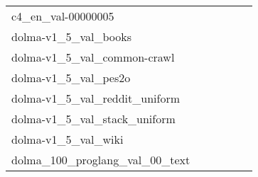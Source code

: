 {\begin{longtable}{m{6cm}m{1.7cm}m{1.7cm}m{1.7cm}m{1.7cm}m{1.7cm}}
	c4\_en\_val-00000005  & \colorbox[HTML]{fefee2}{\makebox[\mywidth][c]{12.77}} & \colorbox[HTML]{e4f4ab}{\makebox[\mywidth][c]{12.35}} & \colorbox[HTML]{ffffe5}{\makebox[\mywidth][c]{13.26}} & \colorbox[HTML]{daf0a4}{\makebox[\mywidth][c]{12.32}} & \colorbox[HTML]{77c578}{\makebox[\mywidth][c]{12.18}}\\
	dolma-v1\_5\_val\_books  & \colorbox[HTML]{fefee2}{\makebox[\mywidth][c]{13.00}} & \colorbox[HTML]{d5eea1}{\makebox[\mywidth][c]{12.44}} & \colorbox[HTML]{ffffe5}{\makebox[\mywidth][c]{13.64}} & \colorbox[HTML]{d4eea0}{\makebox[\mywidth][c]{12.44}} & \colorbox[HTML]{77c578}{\makebox[\mywidth][c]{12.27}}\\
	dolma-v1\_5\_val\_common-crawl  & \colorbox[HTML]{fcfed7}{\makebox[\mywidth][c]{16.86}} & \colorbox[HTML]{ddf1a6}{\makebox[\mywidth][c]{16.37}} & \colorbox[HTML]{ffffe5}{\makebox[\mywidth][c]{18.00}} & \colorbox[HTML]{d9f0a3}{\makebox[\mywidth][c]{16.35}} & \colorbox[HTML]{77c578}{\makebox[\mywidth][c]{16.10}}\\
	dolma-v1\_5\_val\_pes2o  & \colorbox[HTML]{b6e092}{\makebox[\mywidth][c]{9.42}} & \colorbox[HTML]{dcf1a5}{\makebox[\mywidth][c]{9.56}} & \colorbox[HTML]{ffffe5}{\makebox[\mywidth][c]{11.25}} & \colorbox[HTML]{b3df91}{\makebox[\mywidth][c]{9.41}} & \colorbox[HTML]{77c578}{\makebox[\mywidth][c]{9.29}}\\
	dolma-v1\_5\_val\_reddit\_uniform  & \colorbox[HTML]{fefee3}{\makebox[\mywidth][c]{23.04}} & \colorbox[HTML]{bde395}{\makebox[\mywidth][c]{21.97}} & \colorbox[HTML]{ffffe5}{\makebox[\mywidth][c]{23.84}} & \colorbox[HTML]{d3eda0}{\makebox[\mywidth][c]{22.05}} & \colorbox[HTML]{77c578}{\makebox[\mywidth][c]{21.80}}\\
	dolma-v1\_5\_val\_stack\_uniform  & \colorbox[HTML]{b2df90}{\makebox[\mywidth][c]{2.30}} & \colorbox[HTML]{e8f6ae}{\makebox[\mywidth][c]{2.33}} & \colorbox[HTML]{ffffe5}{\makebox[\mywidth][c]{2.53}} & \colorbox[HTML]{a5d98b}{\makebox[\mywidth][c]{2.30}} & \colorbox[HTML]{77c578}{\makebox[\mywidth][c]{2.29}}\\
	dolma-v1\_5\_val\_wiki  & \colorbox[HTML]{fefee3}{\makebox[\mywidth][c]{10.86}} & \colorbox[HTML]{e9f6af}{\makebox[\mywidth][c]{10.48}} & \colorbox[HTML]{ffffe5}{\makebox[\mywidth][c]{11.25}} & \colorbox[HTML]{d1ec9f}{\makebox[\mywidth][c]{10.41}} & \colorbox[HTML]{77c578}{\makebox[\mywidth][c]{10.31}}\\
	dolma\_100\_proglang\_val\_00\_text  & \colorbox[HTML]{77c578}{\makebox[\mywidth][c]{5.61}} & \colorbox[HTML]{fefee0}{\makebox[\mywidth][c]{6.30}} & \colorbox[HTML]{ffffe5}{\makebox[\mywidth][c]{6.94}} & \colorbox[HTML]{a4d98a}{\makebox[\mywidth][c]{5.67}} & \colorbox[HTML]{afdd8f}{\makebox[\mywidth][c]{5.69}}\\

\end{longtable}}
